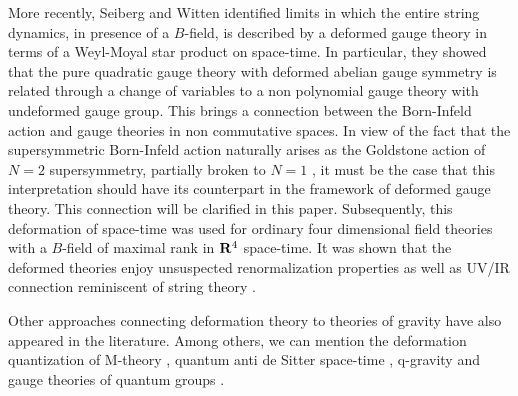 \documentclass[a4paper,12pt]{article}
\begin{document}
 More recently, Seiberg and Witten \cite{sw}
identified limits in which the entire string dynamics, in
presence of a $B$-field, is described by a 
 deformed  gauge theory in terms of a Weyl-Moyal star product on
space-time.
In particular, they showed  that the pure quadratic gauge theory with
deformed abelian 
gauge symmetry is related through a change of variables to a non
polynomial gauge theory 
with undeformed gauge group. This brings a connection between the
Born-Infeld action and
gauge theories in non commutative spaces. In view of the fact that the
supersymmetric 
Born-Infeld \cite{cf} action naturally arises as the Goldstone action of
$N=2$ supersymmetry,
partially broken to $N=1$ \cite{bg}, it must be the case that this
interpretation should have its 
counterpart in the framework of deformed gauge theory. This connection
will be clarified in this paper. 
 Subsequently,
this  deformation of space-time was used  for  ordinary four dimensional
field theories with a 
$B$-field of maximal rank in ${\bf R}^4$ space-time.
It was shown that the deformed theories enjoy unsuspected renormalization
properties as well
as UV/IR connection reminiscent of string theory \cite{mrs}. 

Other approaches connecting deformation theory to theories of gravity have
also  
appeared in the literature.  Among others, we can mention the deformation quantization
of M-theory
\cite{mn}, quantum anti de Sitter space-time \cite{hs},  q-gravity
\cite{finki} and
gauge theories of quantum groups \cite{c}.
\end{document}
